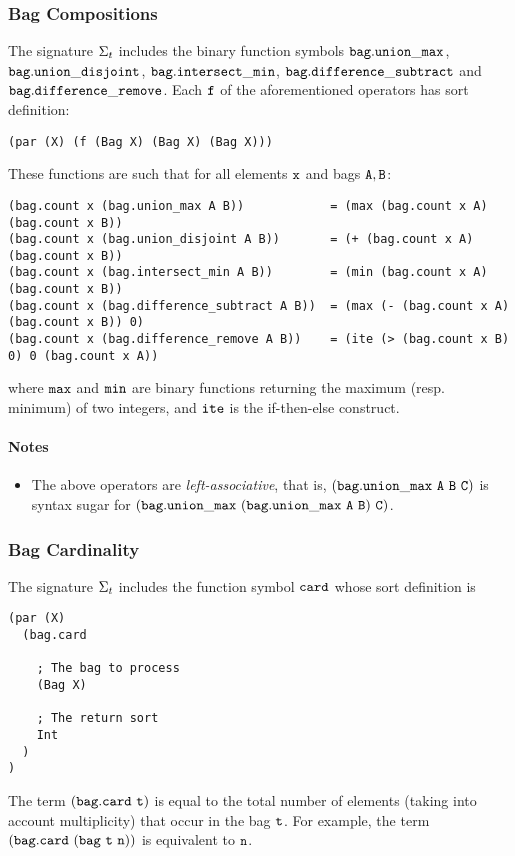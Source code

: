 \documentclass[english,a4paper,10pt]{article}
\begin{document}
\subsubsection{Bag Compositions}
\label{sec:bag-compositions}
The signature $\Sigma_{t}$ includes 
the binary function symbols 
${\tt bag.union\_max}$, ${\tt bag.union\_disjoint}$, 
${\tt bag.intersect\_min}$, ${\tt bag.difference\_subtract}$ and
${\tt bag.difference\_remove}$.
Each ${\tt f}$ of the aforementioned operators
has sort definition:
\begin{verbatim}
(par (X) (f (Bag X) (Bag X) (Bag X)))
\end{verbatim}
These functions are such that for all elements ${\tt x}$
and bags ${\tt A,B}$:
\begin{verbatim}
(bag.count x (bag.union_max A B))            = (max (bag.count x A) (bag.count x B))
(bag.count x (bag.union_disjoint A B))       = (+ (bag.count x A) (bag.count x B))
(bag.count x (bag.intersect_min A B))        = (min (bag.count x A) (bag.count x B))
(bag.count x (bag.difference_subtract A B))  = (max (- (bag.count x A) (bag.count x B)) 0)
(bag.count x (bag.difference_remove A B))    = (ite (> (bag.count x B) 0) 0 (bag.count x A))
\end{verbatim}
where ${\tt max}$ and ${\tt min}$ are binary functions
returning the maximum (resp. minimum) of two integers, and ${\tt ite}$
is the if-then-else construct.

\paragraph{Notes}
\begin{itemize}
\item
The above operators are \emph{left-associative}, that is,
${\tt (bag.union\_max\ A\ B\ C)}$ is syntax sugar for
$\syntax{(bag.union\_max\ (bag.union\_max\ A\ B)\ C)}$.
\end{itemize}

\subsubsection{Bag Cardinality}
The signature $\Sigma_{t}$ includes 
the function symbol ${\tt card}$ whose sort definition is
\begin{verbatim}
(par (X) 
  (bag.card 
  
    ; The bag to process
    (Bag X) 
    
    ; The return sort
    Int
  )
)
\end{verbatim}
The term ${\tt (bag.card\ t)}$ is equal to
the total number of elements (taking into account multiplicity)
that occur in the bag ${\tt t}$.
For example, the term $\syntax{(bag.card\ (bag\ t\ n))}$ is
equivalent to ${\tt n}$.
\end{document}
